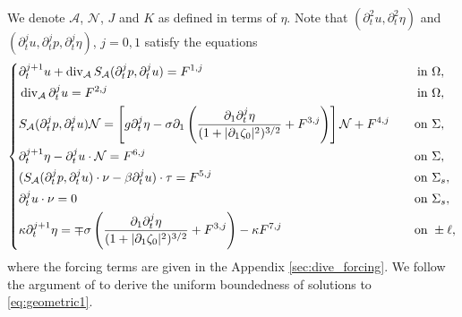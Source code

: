 \documentclass[letterpaper,reqno,10pt,twoside]{amsart}
\theoremstyle{definition}
\theoremstyle{remark}
\def\p{\partial}
\def\Om{\Omega}
\def\dive{\mathop{\rm div}\nolimits}
\begin{document}
		We denote $\mathcal{A}$, $\mathcal{N}$, $J$ and $K$ as defined in terms of $\eta$. Note that $(\p_t^2u, \p_t^2\eta)$ and $(\p_t^ju, \p_t^jp, \p_t^j\eta)$, $j=0,1$ satisfy the equations
		\begin{equation}\label{eq:geometric1}
			\left\{
			\begin{aligned}
				&\p_t^{j+1}u+\dive_{\mathcal{A}}S_{\mathcal{A}}(\p_t^jp,\p_t^ju)=F^{1,j}\quad&\text{in}&\ \Om,\\
				&\dive_{\mathcal{A}}\p_t^ju=F^{2,j}\quad&\text{in}&\ \Om,\\
				&S_{\mathcal{A}}(\p_t^jp,\p_t^ju)\mathcal{N}=\left[g\p_t^j\eta-\sigma\p_1\left(\frac{\p_1\p_t^j\eta}{(1+|\p_1\zeta_0|^2)^{3/2}}+F^{3,j}\right)\right]\mathcal{N}+F^{4,j}\quad&\text{on}&\ \Sigma,\\
				&\p_t^{j+1}\eta-\p_t^ju\cdot\mathcal{N}=F^{6,j}\quad&\text{on}&\ \Sigma,\\
				&(S_{\mathcal{A}}(\p_t^jp,\p_t^ju)\cdot\nu-\beta\p_t^ju)\cdot\tau=F^{5,j}\quad&\text{on}&\ \Sigma_s,\\
				&\p_t^ju\cdot\nu=0\quad&\text{on}&\ \Sigma_s,\\
				&\kappa\p_t^{j+1}\eta=\mp\sigma\left(\frac{\p_1\p_t^j\eta}{(1+|\p_1\zeta_0|^2)^{3/2}}+F^{3,j}\right)-\kappa F^{7,j}\quad&\text{on}&\ \pm\ell,
			\end{aligned}
			\right.
		\end{equation}
		where the forcing terms are given in the Appendix \ref{sec:dive_forcing}.
		We follow the argument of \cite[Section 10.2]{GT2020} to derive the uniform boundedness of solutions to \eqref{eq:geometric1}.
		
\end{document}
